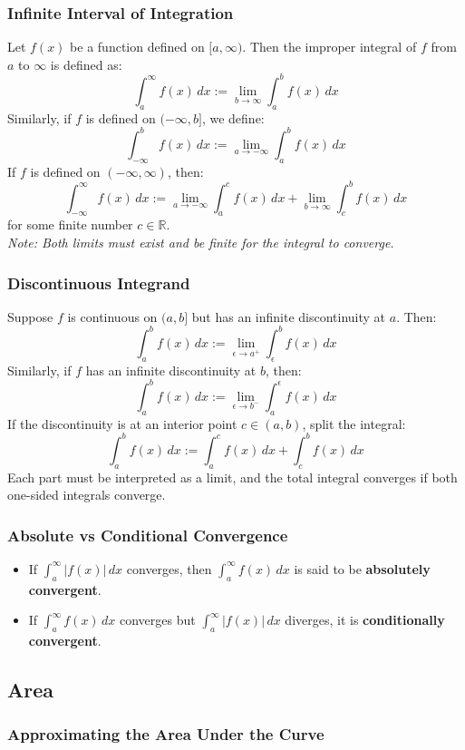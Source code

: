 \documentclass[11pt]{article}
\begin{document}
\subsubsection*{Infinite Interval of Integration}
Let $f(x)$ be a function defined on $[a, \infty)$. Then the improper integral of $f$ from $a$ to $\infty$ is defined as:
\[
    \int_a^{\infty} f(x)\,dx := \lim_{b \to \infty} \int_a^b f(x)\,dx
\]
Similarly, if $f$ is defined on $(-\infty, b]$, we define:
\[
    \int_{-\infty}^{b} f(x)\,dx := \lim_{a \to -\infty} \int_a^b f(x)\,dx
\]
If $f$ is defined on $(-\infty, \infty)$, then:
\[
    \int_{-\infty}^{\infty} f(x)\,dx := \lim_{a \to -\infty} \int_a^c f(x)\,dx + \lim_{b \to \infty} \int_c^b f(x)\,dx
\]
for some finite number $c \in \mathbb{R}$.\\[.5em]
\textit{Note: Both limits must exist and be finite for the integral to converge.}
\subsubsection*{Discontinuous Integrand}
Suppose $f$ is continuous on $(a, b]$ but has an infinite discontinuity at $a$. Then:
\[
    \int_a^b f(x)\,dx := \lim_{\epsilon \to a^+} \int_{\epsilon}^b f(x)\,dx
\]
Similarly, if $f$ has an infinite discontinuity at $b$, then:
\[
    \int_a^b f(x)\,dx := \lim_{\epsilon \to b^-} \int_a^{\epsilon} f(x)\,dx
\]
If the discontinuity is at an interior point $c \in (a,b)$, split the integral:
\[
    \int_a^b f(x)\,dx := \int_a^c f(x)\,dx + \int_c^b f(x)\,dx
\]
Each part must be interpreted as a limit, and the total integral converges if both one-sided integrals converge.
\subsubsection*{Absolute vs Conditional Convergence}
\begin{itemize}
    \item If $\displaystyle\int_a^{\infty} |f(x)|\,dx$ converges, then $\displaystyle\int_a^{\infty} f(x)\,dx$ is said to be \textbf{absolutely convergent}.
    \item If $\displaystyle\int_a^{\infty} f(x)\,dx$ converges but $\displaystyle\int_a^{\infty} |f(x)|\,dx$ diverges, it is \textbf{conditionally convergent}.
\end{itemize}
\subsection{Area}
\subsubsection{Approximating the Area Under the Curve}
\end{document}
